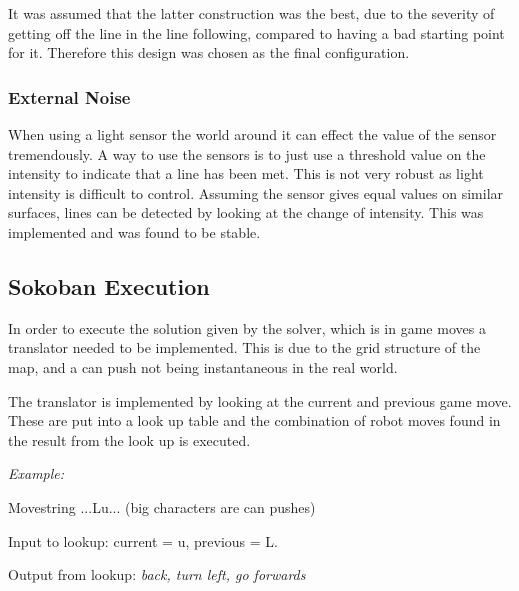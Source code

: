 It was assumed that the latter construction was the best, due to the severity of getting off the line in the line following, compared to having a bad starting point for it. Therefore this design was chosen as the final configuration.

\subsubsection{External Noise}
When using a light sensor the world around it can effect the value of the sensor tremendously.
A way to use the sensors is to just use a threshold value on the intensity to indicate that a line has been met.
This is not very robust as light intensity is difficult to control.
Assuming the sensor gives equal values on similar surfaces, lines can be detected by looking at the change of intensity.
This was implemented and was found to be stable.

\subsection{Sokoban Execution}

In order to execute the solution given by the solver, which is in game moves a translator needed to be implemented. This is due to the grid structure of the map, and a can push not being instantaneous in the real world.

The translator is implemented by looking at the current and previous game move. These are put into a look up table and the combination of robot moves found in the result from the look up is executed. 

\vspace{10pt}
{\large \textit{Example:}} 

\noindent
Movestring ...Lu... (big characters are can pushes)

\noindent
Input to lookup: current = u, previous = L.

\noindent
Output from lookup: \textit{back, turn left, go forwards}

